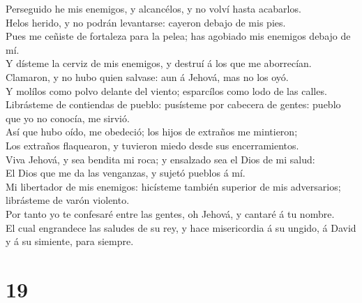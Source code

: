  Perseguido he mis enemigos, y alcancélos, y no volví hasta
acabarlos.\\
 Helos herido, y no podrán levantarse: cayeron debajo de
mis pies.\\
 Pues me ceñiste de fortaleza para la pelea; has agobiado
mis enemigos debajo de mí.\\
 Y dísteme la cerviz de mis enemigos, y destruí á los que
me aborrecían.\\
 Clamaron, y no hubo quien salvase: aun á Jehová, mas no
los oyó.\\
 Y molílos como polvo delante del viento; esparcílos como
lodo de las calles.\\
 Librásteme de contiendas de pueblo: pusísteme por cabecera
de gentes: pueblo que yo no conocía, me sirvió.\\
 Así que hubo oído, me obedeció; los hijos de extraños me
mintieron;\\
 Los extraños flaquearon, y tuvieron miedo desde sus
encerramientos.\\
 Viva Jehová, y sea bendita mi roca; y ensalzado sea el
Dios de mi salud:\\
 El Dios que me da las venganzas, y sujetó pueblos á mí.\\
 Mi libertador de mis enemigos: hicísteme también superior
de mis adversarios; librásteme de varón violento.\\
 Por tanto yo te confesaré entre las gentes, oh Jehová, y
cantaré á tu nombre.\\
 El cual engrandece las saludes de su rey, y hace
misericordia á su ungido, á David y á su simiente, para siempre.

\hypertarget{section-18}{%
\section{19}\label{section-18}}

